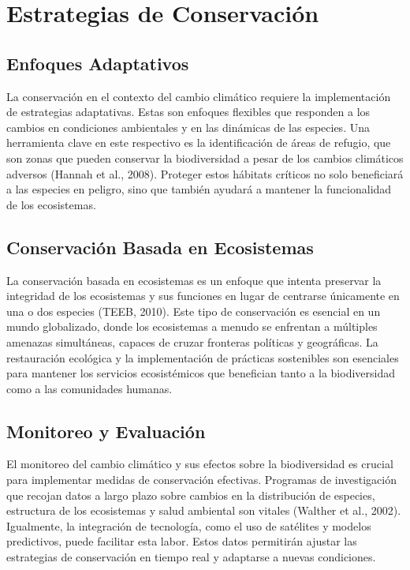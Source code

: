 \documentclass[
  letterpaper,
  DIV=11,
  numbers=noendperiod,
  oneside]{scrreprt}
\begin{document}
\section{Estrategias de
Conservación}\label{estrategias-de-conservaciuxf3n}

\subsection{Enfoques Adaptativos}\label{enfoques-adaptativos}

La conservación en el contexto del cambio climático requiere la
implementación de estrategias adaptativas. Estas son enfoques flexibles
que responden a los cambios en condiciones ambientales y en las
dinámicas de las especies. Una herramienta clave en este respectivo es
la identificación de áreas de refugio, que son zonas que pueden
conservar la biodiversidad a pesar de los cambios climáticos adversos
(Hannah et al., 2008). Proteger estos hábitats críticos no solo
beneficiará a las especies en peligro, sino que también ayudará a
mantener la funcionalidad de los ecosistemas.

\subsection{Conservación Basada en
Ecosistemas}\label{conservaciuxf3n-basada-en-ecosistemas}

La conservación basada en ecosistemas es un enfoque que intenta
preservar la integridad de los ecosistemas y sus funciones en lugar de
centrarse únicamente en una o dos especies (TEEB, 2010). Este tipo de
conservación es esencial en un mundo globalizado, donde los ecosistemas
a menudo se enfrentan a múltiples amenazas simultáneas, capaces de
cruzar fronteras políticas y geográficas. La restauración ecológica y la
implementación de prácticas sostenibles son esenciales para mantener los
servicios ecosistémicos que benefician tanto a la biodiversidad como a
las comunidades humanas.

\subsection{Monitoreo y Evaluación}\label{monitoreo-y-evaluaciuxf3n}

El monitoreo del cambio climático y sus efectos sobre la biodiversidad
es crucial para implementar medidas de conservación efectivas. Programas
de investigación que recojan datos a largo plazo sobre cambios en la
distribución de especies, estructura de los ecosistemas y salud
ambiental son vitales (Walther et al., 2002). Igualmente, la integración
de tecnología, como el uso de satélites y modelos predictivos, puede
facilitar esta labor. Estos datos permitirán ajustar las estrategias de
conservación en tiempo real y adaptarse a nuevas condiciones.
\end{document}
